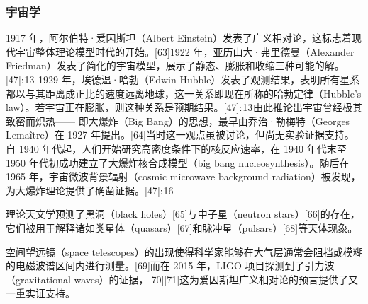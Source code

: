 \subsubsection{宇宙学}
1917 年，阿尔伯特·爱因斯坦（Albert Einstein）发表了广义相对论，这标志着现代宇宙整体理论模型时代的开始。[63]1922 年，亚历山大·弗里德曼（Alexander Friedman）发表了简化的宇宙模型，展示了静态、膨胀和收缩三种可能的解。[47]: 13  1929 年，埃德温·哈勃（Edwin Hubble）发表了观测结果，表明所有星系都以与其距离成正比的速度远离地球，这一关系即现在所称的哈勃定律（Hubble’s law）。若宇宙正在膨胀，则这种关系是预期结果。[47]: 13 由此推论出宇宙曾经极其致密而炽热—— 即大爆炸（Big Bang）的思想，最早由乔治·勒梅特（Georges Lemaître）在 1927 年提出。[64]当时这一观点虽被讨论，但尚无实验证据支持。自 1940 年代起，人们开始研究高密度条件下的核反应速率，在 1940 年代末至 1950 年代初成功建立了大爆炸核合成模型（big bang nucleosynthesis）。随后在 1965 年，宇宙微波背景辐射（cosmic microwave background radiation）被发现，为大爆炸理论提供了确凿证据。[47]: 16   

理论天文学预测了黑洞（black holes）[65]与中子星（neutron stars）[66]的存在，  
它们被用于解释诸如类星体（quasars）[67]和脉冲星（pulsars）[68]等天体现象。  

空间望远镜（space telescopes）的出现使得科学家能够在大气层通常会阻挡或模糊的电磁波谱区间内进行测量。[69]而在 2015 年，LIGO 项目探测到了引力波（gravitational waves）的证据，[70][71]这为爱因斯坦广义相对论的预言提供了又一重实证支持。

